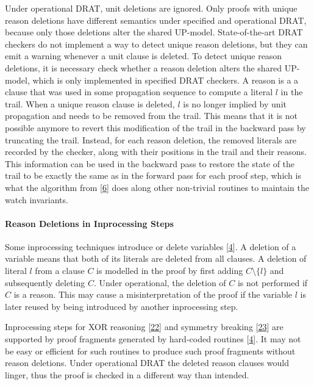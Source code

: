 \documentclass[
]{report}
\begin{document}
Under operational DRAT, unit deletions are ignored. Only proofs with
unique reason deletions have different semantics under specified and
operational DRAT, because only those deletions alter the shared
UP-model. State-of-the-art DRAT checkers do not implement a way to
detect unique reason deletions, but they can emit a warning whenever a
unit clause is deleted. To detect unique reason deletions, it is
necessary check whether a reason deletion alters the shared UP-model,
which is only implemented in specified DRAT checkers. A reason is a a
clause that was used in some propagation sequence to compute a literal
\(l\) in the trail. When a unique reason clause is deleted, \(l\) is no
longer implied by unit propagation and needs to be removed from the
trail. This means that it is not possible anymore to revert this
modification of the trail in the backward pass by truncating the trail.
Instead, for each reason deletion, the removed literals are recorded by
the checker, along with their positions in the trail and their reasons.
This information can be used in the backward pass to restore the state
of the trail to be exactly the same as in the forward pass for each
proof step, which is what the algorithm from
{[}\protect\hyperlink{ref-DBLP:confux2ffmcadux2fRebola-PardoC18}{6}{]}
does along other non-trivial routines to maintain the watch invariants.

\paragraph{Reason Deletions in Inprocessing Steps}

Some inprocessing techniques introduce or delete variables
{[}\protect\hyperlink{ref-DBLP:confux2fsatux2fRebola-PardoB18}{4}{]}. A
deletion of a variable means that both of its literals are deleted from
all clauses. A deletion of literal \(l\) from a clause \(C\) is modelled
in the proof by first adding \(C \setminus \{l\}\) and subsequently
deleting \(C\). Under operational, the deletion of \(C\) is not
performed if \(C\) is a reason. This may cause a misinterpretation of
the proof if the variable \(l\) is later reused by being introduced by
another inprocessing step.

Inprocessing steps for XOR reasoning
{[}\protect\hyperlink{ref-DBLP:confux2fjeliaux2fPhilippR16}{22}{]} and
symmetry breaking
{[}\protect\hyperlink{ref-DBLP:confux2fcadeux2fHeuleHW15}{23}{]} are
supported by proof fragments generated by hard-coded routines
{[}\protect\hyperlink{ref-DBLP:confux2fsatux2fRebola-PardoB18}{4}{]}. It
may not be easy or efficient for such routines to produce such proof
fragments without reason deletions. Under operational DRAT the deleted
reason clauses would linger, thus the proof is checked in a different
way than intended.
\end{document}
